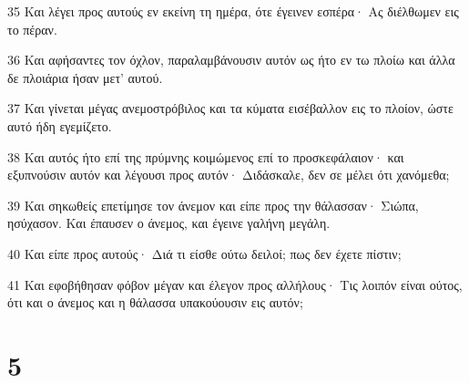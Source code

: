 \par 35 Και λέγει προς αυτούς εν εκείνη τη ημέρα, ότε έγεινεν εσπέρα· Ας διέλθωμεν εις το πέραν.
\par 36 Και αφήσαντες τον όχλον, παραλαμβάνουσιν αυτόν ως ήτο εν τω πλοίω και άλλα δε πλοιάρια ήσαν μετ' αυτού.
\par 37 Και γίνεται μέγας ανεμοστρόβιλος και τα κύματα εισέβαλλον εις το πλοίον, ώστε αυτό ήδη εγεμίζετο.
\par 38 Και αυτός ήτο επί της πρύμνης κοιμώμενος επί το προσκεφάλαιον· και εξυπνούσιν αυτόν και λέγουσι προς αυτόν· Διδάσκαλε, δεν σε μέλει ότι χανόμεθα;
\par 39 Και σηκωθείς επετίμησε τον άνεμον και είπε προς την θάλασσαν· Σιώπα, ησύχασον. Και έπαυσεν ο άνεμος, και έγεινε γαλήνη μεγάλη.
\par 40 Και είπε προς αυτούς· Διά τι είσθε ούτω δειλοί; πως δεν έχετε πίστιν;
\par 41 Και εφοβήθησαν φόβον μέγαν και έλεγον προς αλλήλους· Τις λοιπόν είναι ούτος, ότι και ο άνεμος και η θάλασσα υπακούουσιν εις αυτόν;

\chapter{5}

